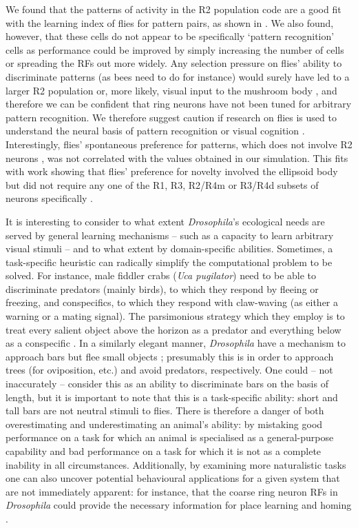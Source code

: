 We found that the patterns of activity in the R2 population code are a good fit with the learning index of flies for pattern pairs, as shown in \cite{Ernst1999}. We also found, however, that these cells do not appear to be specifically ‘pattern recognition’ cells as performance could be improved by simply increasing the number of cells or spreading the RFs out more widely. Any selection pressure on flies’ ability to discriminate patterns (as bees need to do for instance) would surely have led to a larger R2 population or, more likely, visual input to the mushroom body \cite{Ehmer2002,Wolf1998}, and therefore we can be confident that ring neurons have not been tuned for arbitrary pattern recognition. We therefore suggest caution if research on flies is used to understand the neural basis of pattern recognition or visual cognition \cite{Menzel2001}. Interestingly, flies’ spontaneous preference for patterns, which does not involve R2 neurons \cite{Ernst1999}, was not correlated with the values obtained in our simulation. This fits with work showing that flies’ preference for novelty involved the ellipsoid body but did not require any one of the R1, R3, R2/R4m or R3/R4d subsets of neurons specifically \cite{Solanki2015}.

It is interesting to consider to what extent \emph{Drosophila}'s ecological needs are served by general learning mechanisms -- such as a capacity to learn arbitrary visual stimuli -- and to what extent by domain-specific abilities.
Sometimes, a task-specific heuristic can radically simplify the computational problem to be solved.
For instance, male fiddler crabs (\emph{Uca pugilator}) need to be able to discriminate predators (mainly birds), to which they respond by fleeing or freezing, and conspecifics, to which they respond with claw-waving (as either a warning or a mating signal).
The parsimonious strategy which they employ is to treat every salient object above the horizon as a predator and everything below as a conspecific \cite{Layne1997}.
In a similarly elegant manner, \emph{Drosophila} have a mechanism to approach bars but flee small objects \cite{Maimon2008}; presumably this is in order to approach trees (for oviposition, etc.) and avoid predators, respectively.
One could -- not inaccurately -- consider this as an ability to discriminate bars on the basis of length, but it is important to note that this is a task-specific ability: short and tall bars are not neutral stimuli to flies.
There is therefore a danger of both overestimating and underestimating an animal's ability: by mistaking good performance on a task for which an animal is specialised as a general-purpose capability and bad performance on a task for which it is not as a complete inability in all circumstances.
Additionally, by examining more naturalistic tasks one can also uncover potential behavioural applications for a given system that are not immediately apparent: for instance, that the coarse ring neuron RFs in \emph{Drosophila} could provide the necessary information for place learning and homing \cite{Dewar2015}.

